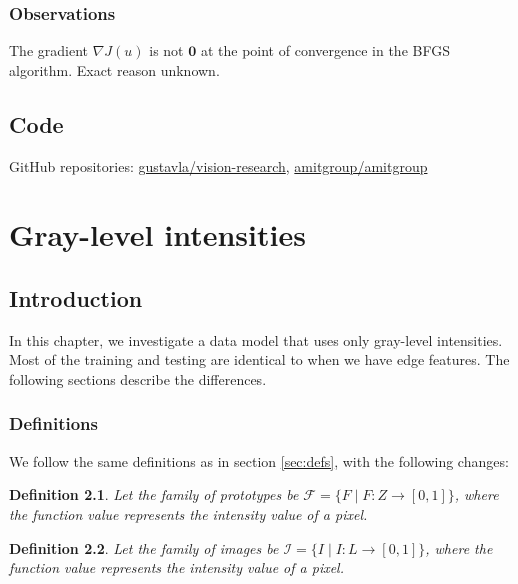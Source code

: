 \documentclass{report}
\newtheorem{mydef}{Definition}
\begin{document}
\subsection{Observations}
The gradient $\nabla J(u)$ is not $\mathbf{0}$ at the point of convergence in the BFGS algorithm. Exact reason unknown.

\section{Code}
GitHub repositories: \href{https://github.com/gustavla/vision-research/}{gustavla/vision-research}, \href{https://github.com/amitgroup/amitgroup}{amitgroup/amitgroup}

\chapter{Gray-level intensities}

\section{Introduction}
In this chapter, we investigate a data model that uses only gray-level intensities. Most of the training and testing are identical to when we have edge features. The following sections describe the differences.

\subsection{Definitions}

We follow the same definitions as in section \ref{sec:defs}, with the following changes:

\begin{mydef}
Let the family of prototypes be $\mathcal{F} = \{ F \mid F : Z \rightarrow [0, 1]\}$, where the function value represents the intensity value of a pixel.
\end{mydef}

\begin{mydef}
Let the family of images be $\mathcal{I} = \{ I \mid I : L \rightarrow [0, 1]\}$, where the function value represents the intensity value of a pixel. 
\end{mydef}
\end{document}
